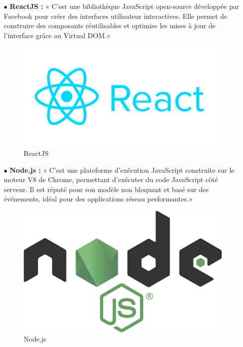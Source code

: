 \begin{itemize}
    \item[$\bullet$] \textbf{ ReactJS :}
          « C'est une bibliothèque JavaScript open-source développée par Facebook pour créer des interfaces utilisateur interactives. Elle permet de construire des composants réutilisables et optimise les mises à jour de l'interface grâce au Virtual DOM.»

          \begin{figure}[ht]
              \centering \includegraphics[scale=0.28]{chap1.images/reactjs_logo.png}
              \caption{ReactJS}

          \end{figure}

    \item[$\bullet$] \textbf{ Node.js :}
          « C'est une plateforme d'exécution JavaScript construite sur le moteur V8 de Chrome, permettant d'exécuter du code JavaScript côté serveur. Il est réputé pour son modèle non bloquant et basé sur des événements, idéal pour des applications réseau performantes.»

          \begin{figure}[ht]
              \centering \includegraphics[scale=0.025]{chap1.images/Node_logo_NodeJS.png}
              \caption{Node.js}


\end{figure}
\end{itemize}
